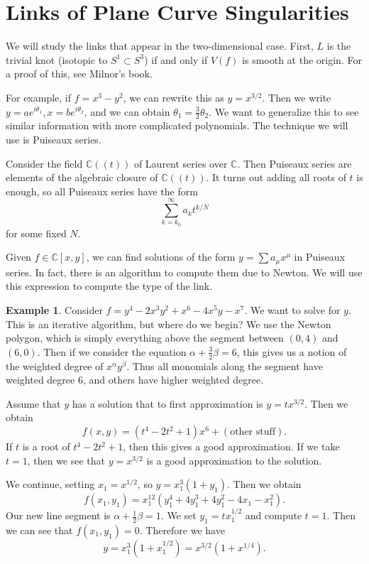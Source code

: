 \documentclass[leqno, openany]{memoir}
\theoremstyle{definition}
\newtheorem{exm}[thm]{Example}
\theoremstyle{remark}
\theoremstyle{plain}
\theoremstyle{definition}
\theoremstyle{remark}
\newcommand{\C}{\mathbb{C}}
\begin{document}
\section{Links of Plane Curve Singularities}%
\label{sec:algebraic_knots_and_links}

We will study the links that appear in the two-dimensional case. First, $L$ is
the trivial knot (isotopic to $S^1 \subset S^3$) if and only if $V(f)$ is
smooth at the origin. For a proof of this, see Milnor's book.

For example, if $f = x^3 - y^2$, we can rewrite this as $y = x^{3/2}$. Then we
write $y = ae^{i\theta_1}, x = be^{i\theta_2}$, and we can obtain $\theta_1 =
\frac{3}{2} \theta_2$. We want to generalize this to see similar information
with more complicated polynomials. The technique we will use is Puiseaux
series.

Consider the field $\C((t))$ of Laurent series over $\C$. Then Puiseaux series
are elements of the algebraic closure of $\C((t))$. It turns out adding all
roots of $t$ is enough, so all Puiseaux series have the form \[ \sum_{k =
k_0}^{\infty} a_k t^{k/N} \] for some fixed $N$. 

Given $f \in \C[x,y]$, we can find solutions of the form $y = \sum a_{\mu}
x^{\mu}$ in Puiseaux series. In fact, there is an algorithm to compute them due
to Newton. We will use this expression to compute the type of the link.

\begin{exm} Consider $f = y^4 - 2x^3y^2 + x^6 - 4x^5y - x^7$. We want to solve
    for $y$. This is an iterative algorithm, but where do we begin? We use the
    Newton polygon, which is simply everything above the segment between
    $(0,4)$ and $(6,0)$. Then if we consider the equation $\alpha + \frac{3}{2}
    \beta = 6$, this gives us a notion of the weighted degree of
    $x^{\alpha}y^{\beta}$. Thus all monomials along the segment have weighted
    degree $6$, and others have higher weighted degree. 

    Assume that $y$ has a solution that to first approximation is $y =
    tx^{3/2}$. Then we obtain \[ f(x,y) = (t^4 - 2t^2 + 1)x^6 + (\text{other
    stuff}). \] If $t$ is a root of $t^4-2t^2+1$, then this gives a good
    approximation. If we take $t=1$, then we see that $y=x^{3/2}$ is a good
    approximation to the solution.

    We continue, setting $x_1 = x^{1/2}$, so $y = x_1^3(1 + y_1)$. Then we
    obtain \[ f(x_1, y_1) = x_1^{12}(y_1^4 + 4y_1^3 + 4y_1^2 - 4x_1 - x_1^2).
    \] Our new line segment is $\alpha + \frac{1}{2} \beta = 1$. We set $y_1 =
    tx_1^{1/2}$ and compute $t = 1$. Then we can see that $f(x_1, y_1) = 0$.
    Therefore we have \[ y = x_1^3(1+x_1^{1/2}) = x^{3/2}(1+x^{1/4}). \]
\end{exm}
\end{document}
